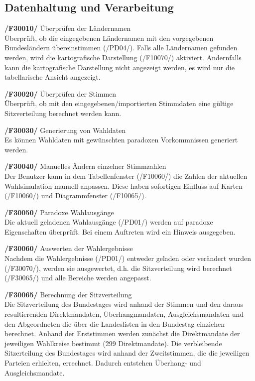 \documentclass[10pt,a4paper]{article}
\begin{document}
\subsection{Datenhaltung und Verarbeitung}
\begin{description}
	\item \textbf{/F30010/} Überprüfen der Ländernamen \hfill \\
	Überprüft, ob die eingegebenen Ländernamen mit den vorgegebenen Bundesländern übereinstimmen (/PD04/). Falls alle Ländernamen gefunden werden, wird die kartografische Darstellung (/F10070/) aktiviert. Andernfalls kann die kartografische Darstellung nicht angezeigt werden, es wird nur die tabellarische Ansicht angezeigt.
	\item \textbf{/F30020/} Überprüfen der Stimmen\hfill \\
	Überprüft, ob mit den eingegebenen/importierten Stimmdaten eine gültige Sitzverteilung berechnet werden kann.		
	\item \textbf{/F30030/} Generierung von Wahldaten \hfill \\
	Es können Wahldaten mit gewünschten paradoxen Vorkommnissen generiert werden.
	\item \textbf{/F30040/} Manuelles Ändern einzelner Stimmzahlen \hfill \\
	Der Benutzer kann in dem Tabellenfenster (/F10060/) die Zahlen der aktuellen Wahlsimulation manuell anpassen.
	Diese haben sofortigen Einfluss auf Karten- (/F10060/) und Diagrammfenster (/F10065/).
	\item \textbf{/F30050/} Paradoxe Wahlausgänge \hfill \\
	Die aktuell geladenen Wahlausgänge (/PD01/) werden auf paradoxe Eigenschaften überprüft. Bei einem Auftreten wird ein Hinweis ausgegeben.
	\item \textbf{/F30060/} Auswerten der Wahlergebnisse \hfill \\
	Nachdem die Wahlergebnisse (/PD01/) entweder geladen oder verändert wurden (/F30070/), werden sie ausgewertet, d.h. die Sitzverteilung wird berechnet (/F30065/) und alle Bereiche werden angepasst.
	\item \textbf{/F30065/} Berechnung der Sitzverteilung \hfill \\
	Die Sitzverteilung des Bundestages wird anhand der Stimmen und den daraus resultierenden Direktmandaten, Überhangmandaten, Ausgleichsmandaten und den Abgeordneten die über die Landeslisten in den Bundestag einziehen berechnet. Anhand der Erststimmen werden zunächst die Direktmandate der jeweiligen Wahlkreise bestimmt (299 Direktmandate). Die verbleibende Sitzerteilung des Bundestages wird anhand der Zweitstimmen, die die jeweiligen Parteien erhielten, errechnet. Dadurch entstehen Überhang- und Ausgleichsmandate.

\end{description}
\end{document}
